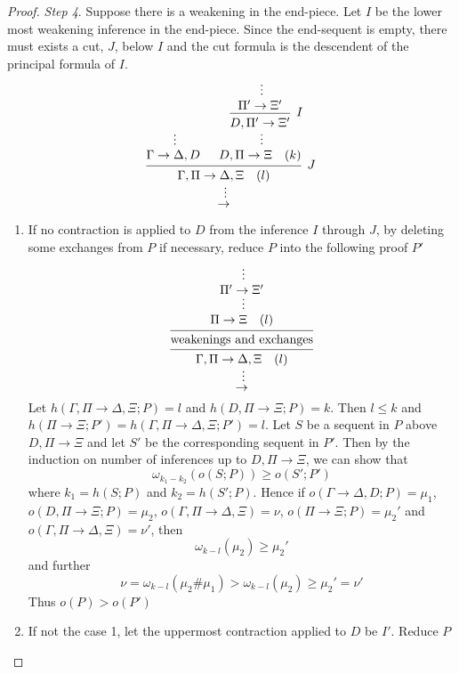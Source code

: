 \documentclass[11pt]{article}
\begin{document}
\begin{enumerate}
\begin{proof}
\emph{Step 4}. Suppose there is a weakening in the end-piece. Let \(I\) be the lower most weakening
inference in the end-piece. Since the end-sequent is empty, there must exists a cut, \(J\),
below \(I\) and the cut formula is the descendent of the principal formula of \(I\).
  \begin{equation*}
\begin{prooftree}%
\hypo{}
\ellipsis{}{\Gamma \to \Delta,D}
\hypo{}
\ellipsis{}{\Pi' \to \Xi'}
\infer1[\(I\)]{D,\Pi'\to\Xi'}
\ellipsis{}{D,\Pi\to\Xi\quad(k)}
\infer2[\(J\)]{\Gamma,\Pi\to\Delta,\Xi \quad(l)}
\ellipsis{}{\to}
\end{prooftree}
  \end{equation*}
\begin{enumerate}
\item If no contraction is applied to \(D\) from the inference \(I\)  through \(J\), by deleting
some exchanges from \(P\) if necessary, reduce \(P\) into the following proof \(P'\)
\begin{equation*}
\begin{prooftree}%
\hypo{}
\ellipsis{}{\Pi'\to\Xi'}
\ellipsis{}{\Pi \to \Xi \quad(l)}
\infer1[]{\text{weakenings and exchanges}}
\infer1{\Gamma,\Pi \to \Delta,\Xi \quad(l)}
\ellipsis{}{\to}
\end{prooftree}
\end{equation*}
Let \(h(\Gamma,\Pi \to \Delta,\Xi;P)=l\) and \(h(D,\Pi \to \Xi;P)=k\). Then \(l\le k\)
and \(h(\Pi\to\Xi;P')=h(\Gamma,\Pi\to\Delta,\Xi;P')=l\). Let \(S\) be a sequent in \(P\)
above \(D,\Pi\to\Xi\) and let \(S'\) be the corresponding sequent in \(P'\). Then by the
induction on number of inferences up to \(D,\Pi\to\Xi\), we can show that
\begin{equation*}
\omega_{k_1-k_2}(o(S;P))\ge o(S';P')
\end{equation*}
where \(k_1=h(S;P)\) and \(k_2=h(S';P)\). Hence if \(o(\Gamma \to \Delta,D;P)=\mu_1\),
\(o(D,\Pi\to\Xi;P)=\mu_2\), \(o(\Gamma,\Pi\to\Delta,\Xi)=\nu\), \(o(\Pi\to\Xi;P)=\mu_2'\)
and \(o(\Gamma,\Pi\to\Delta,\Xi)=\nu'\), then
\begin{equation*}
\omega_{k-l}(\mu_2)\ge\mu_2'
\end{equation*}
and further
\begin{equation*}
\nu=\omega_{k-l}(\mu_2\#\mu_1)>\omega_{k-l}(\mu_2)\ge\mu_2'=\nu'
\end{equation*}
Thus \(o(P)>o(P')\)
\item If not the case 1, let the uppermost contraction applied to \(D\) be \(I'\). Reduce \(P\)

\end{enumerate}
\end{proof}
\end{enumerate}
\end{document}

